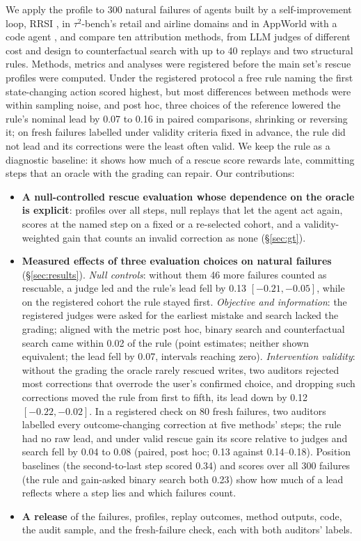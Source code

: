 \documentclass[11pt]{article}
\begin{document}
We apply the profile to 300 natural failures of agents built by a self-improvement loop, RRSI \citep{rrsi2026}, in $\tau^2$-bench's retail and airline domains \citep{barres2025tau2} and in AppWorld with a code agent \citep{trivedi2024appworld}, and compare ten attribution methods, from LLM judges of different cost and design \citep{zhang2025whichagent} to counterfactual search with up to 40 replays and two structural rules. Methods, metrics and analyses were registered before the main set's rescue profiles were computed. Under the registered protocol a free rule naming the first state-changing action scored highest, but most differences between methods were within sampling noise, and post hoc, three choices of the reference lowered the rule's nominal lead by 0.07 to 0.16 in paired comparisons, shrinking or reversing it; on fresh failures labelled under validity criteria fixed in advance, the rule did not lead and its corrections were the least often valid. We keep the rule as a diagnostic baseline: it shows how much of a rescue score rewards late, committing steps that an oracle with the grading can repair. Our contributions:
\begin{itemize}
\setlength\itemsep{1pt}
\item \textbf{A null-controlled rescue evaluation whose dependence on the oracle is explicit}: profiles over all steps, null replays that let the agent act again, scores at the named step on a fixed or a re-selected cohort, and a validity-weighted gain that counts an invalid correction as none (\S\ref{sec:gt}).
\item \textbf{Measured effects of three evaluation choices on natural failures} (\S\ref{sec:results}). \emph{Null controls}: without them 46 more failures counted as rescuable, a judge led and the rule's lead fell by 0.13 $[-0.21,-0.05]$, while on the registered cohort the rule stayed first. \emph{Objective and information}: the registered judges were asked for the earliest mistake and search lacked the grading; aligned with the metric post hoc, binary search and counterfactual search came within 0.02 of the rule (point estimates; neither shown equivalent; the lead fell by 0.07, intervals reaching zero). \emph{Intervention validity}: without the grading the oracle rarely rescued writes, two auditors rejected most corrections that overrode the user's confirmed choice, and dropping such corrections moved the rule from first to fifth, its lead down by 0.12 $[-0.22,-0.02]$. In a registered check on 80 fresh failures, two auditors labelled every outcome-changing correction at five methods' steps; the rule had no raw lead, and under valid rescue gain its score relative to judges and search fell by 0.04 to 0.08 (paired, post hoc; 0.13 against 0.14--0.18). Position baselines (the second-to-last step scored 0.34) and scores over all 300 failures (the rule and gain-asked binary search both 0.23) show how much of a lead reflects where a step lies and which failures count.
\item \textbf{A release} of the failures, profiles, replay outcomes, method outputs, code, the audit sample, and the fresh-failure check, each with both auditors' labels.
\end{itemize}
\end{document}
